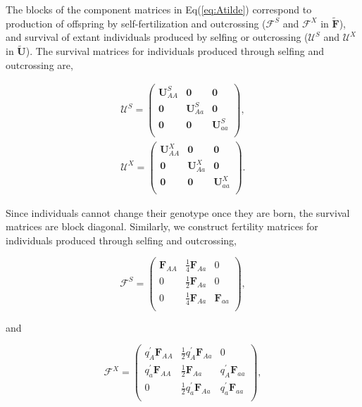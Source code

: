 \documentclass[11pt,draft]{article}
\def\mbf#1{\mathbf{#1}}
\def\mcal#1{\mathcal{#1}}
\begin{document}
The blocks of the component matrices in Eq(\ref{eq:Atilde}) correspond to production of offspring by self-fertilization and outcrossing ($\mcal{F}^S$ and $\mcal{F}^X$ in $\tilde{\mbf{F}}$), and survival of extant individuals produced by selfing or outcrossing ($\mcal{U}^S$ and $\mcal{U}^X$ in $\tilde{\mbf{U}}$). The survival matrices for individuals produced through selfing and outcrossing are,
\begin{linenomath*}
\begin{eqnarray} 
	\mcal{U}^S  = 
		\left(
			\begin{array}{ccc}
				\mbf{U}^{S}_{AA} & \mbf{0} & \mbf{0} \\
				\mbf{0} & \mbf{U}^{S}_{Aa} & \mbf{0} \\
				\mbf{0} & \mbf{0} & \mbf{U}^{S}_{aa} \\
			\end{array} \right),\label{eq:BlkUS}\\
				\mcal{U}^X  = 
		\left(
			\begin{array}{ccc}
				\mbf{U}^{X}_{AA} & \mbf{0} & \mbf{0} \\
				\mbf{0} & \mbf{U}^{X}_{Aa} & \mbf{0} \\
				\mbf{0} & \mbf{0} & \mbf{U}^{X}_{aa} \\
			\end{array} \right).\label{eq:BlkUX}
\end{eqnarray}
\end{linenomath*}
Since individuals cannot change their genotype once they are born, the survival matrices are block diagonal.  Similarly, we construct fertility matrices for individuals produced through selfing and outcrossing, 
\begin{linenomath*}
\begin{equation} \label{eq:BlkFS}
	\mcal{F}^S = 
			\left(
			\begin{array}{ccc}
				\mbf{F}_{AA} & \frac{1}{4} \mbf{F}_{Aa} & 0 \\
				0 & \frac{1}{2} \mbf{F}_{Aa} & 0 \\
				0 & \frac{1}{4} \mbf{F}_{Aa} & \mbf{F}_{aa}\\
			\end{array} \right), 
\end{equation}
\end{linenomath*}
\noindent and 
\begin{linenomath*}
\begin{equation} \label{eq:BlkFX}
	\mcal{F}^X = 
			\left(
			\begin{array}{ccc}
				q^{\prime}_{A} \mbf{F}_{AA} & \frac{1}{2} q^{\prime}_{A} \mbf{F}_{Aa} & 0 \\ 
				q^{\prime}_{a} \mbf{F}_{AA} & \frac{1}{2} \mbf{F}_{Aa} & q^{\prime}_{A} \mbf{F}_{aa}  \\ 
				0 & \frac{1}{2} q^{\prime}_{a} \mbf{F}_{Aa} & q^{\prime}_{a} \mbf{F}_{aa}  \\
			\end{array} \right),
\end{equation}
\end{linenomath*}
\end{document}
